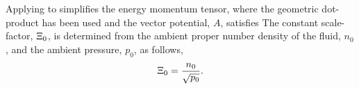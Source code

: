 


Applying  to  simplifies the energy momentum tensor,
where the geometric dot-product has been used and the vector potential, $A$,  satisfies
The constant scale-factor, $\Xi_0$, is determined from the ambient proper number density of the fluid, $n_0$, and the ambient pressure, $p_0$, as follows,
\begin{align}
\Xi_0 = \frac{n_0}{\sqrt{p_0}}. 
\label{eqn:scalefactor}
\end{align}

